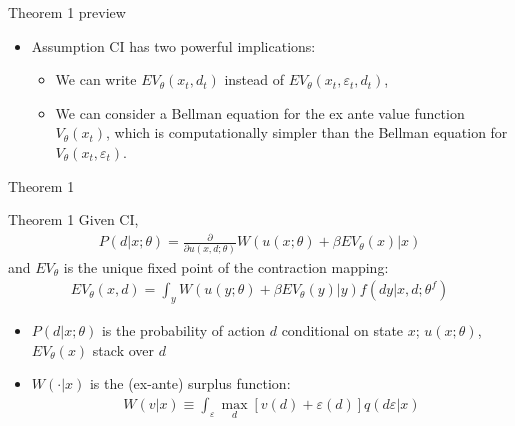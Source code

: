 \documentclass[aspectratio=169,11pt]{beamer}
\begin{document}
\begin{frame}{Theorem 1 preview}
\begin{itemize}
	\item Assumption CI has two powerful implications:
	\begin{itemize}
		\medskip
		\item We can write $ EV_{\theta}\left(x_{t},d_{t}\right)$ instead of $EV_{\theta}\left(x_{t},\varepsilon_{t},d_{t}\right)$,
		\medskip
		\item We can consider a Bellman equation for the \alert{ex ante} value function $ V_{\theta}\left(x_{t}\right)$, which is computationally simpler than
		the Bellman equation for $V_{\theta}\left(x_{t},\varepsilon_{t}\right) $.
	\end{itemize}
\end{itemize}
\end{frame}

\begin{frame}{Theorem 1}
\footnotesize
\begin{block}{Theorem 1}
Given CI,
\begin{align*}
	P\left(d|x;\theta\right) = \frac{\partial}{\partial u \left(x,d;\theta\right)} W\left( u \left(x;\theta\right) +\beta EV_{\theta}\left(x\right) |x\right)
\end{align*}
and  $EV_{\theta}$ is the unique fixed point of the contraction mapping:
\begin{align*}
	EV_{\theta}\left(x,d\right) = \int_{y} W\left(u \left(y;\theta\right)+
	\beta EV_{\theta}\left(y\right)|y\right)
	f\left(dy|x,d;\theta^f\right)
\end{align*}
\begin{itemize}
	\item $P\left(d|x;\theta\right)$ is the probability of action $d$ conditional on state $x$; $u(x;\theta)$, $EV_\theta(x)$ stack over $d$
	\item $W\left( \cdot |x\right)$ is the (ex-ante) surplus function:
	\begin{align*}
	W\left(v |x\right) \equiv \int_{\varepsilon}  \max_{d} \left[v\left( d \right) +\varepsilon\left( d \right)\right]
	q\left(d\varepsilon|x\right)
	\end{align*}
\end{itemize}
\end{block}
\end{frame}
\end{document}
